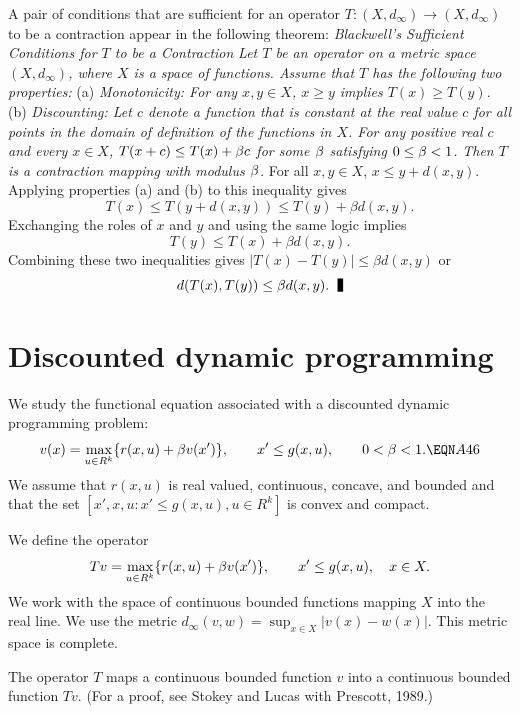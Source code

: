 A pair of conditions that are sufficient for an operator $T:(X,d_\infty)\to
(X,d_\infty)$ to be a contraction appear in the following
theorem:
\medskip
 {\it Blackwell's Sufficient Conditions for $T$ to
be a Contraction}
\medskip
\noindent
{\it Let $T$ be an operator on a metric space $(X,d_\infty)$, where $X$ is a
space of functions.  Assume that $T$ has the following two
properties:}\hfil\break
\noindent(a) {\it Monotonicity:  For any $x,y\in X$, $x\ge y$ implies $T(x) \ge
T(y)$}.\hfil\break
\noindent(b) {\it Discounting:  Let $c$ denote a function that is constant at the
real value $c$ for all points in the domain of definition of the functions in
$X$.  For any positive real $c$ and every $x\in X$, $T(x+c)\le T(x)+{\beta} c$ for
some ${\beta}$
satisfying $0\le {\beta} <1$.}\hfil\break
\noindent
{\it Then $T$ is a contraction mapping with modulus ${\beta}$.}\endtheorem
\medskip
\proof For all $x,y \in X$, $x \leq y + d(x,y)$.  Applying
properties (a) and  (b) to this inequality gives
$$T(x) \leq T(y+d(x,y)) \leq T(y) + \beta d(x,y). $$
Exchanging the roles of $x$ and $y$ and using the same logic
implies
$$ T(y) \leq T(x) + \beta d(x,y). $$
Combining  these two inequalities gives $|T(x) - T(y)| \leq \beta
d(x,y)$ or
$$ d(T(x), T(y)) \leq \beta d(x,y) . \qed $$

\medskip

\section{Discounted dynamic programming}

We study the functional equation associated with a discounted dynamic
programming problem:
$$v(x)=\max_{u\in R^k} \{r(x,u)+\be v(x')\},\qquad x'\le g(x,u),\qquad
0<\be<1.  \EQN A46 $$
We assume that $r(x,u)$ is real valued, continuous, concave, and bounded and
that the set $[x',x,u:x'\le g(x,u),u\in R^k]$ is convex and compact.

We define the operator
$$Tv=\mathop{\hbox{max}}_{u\in R^k} \{r(x,u)+{\beta} v(x')\},\qquad x'\le g(x,u),\quad x\in X.$$
We work with the space of continuous bounded functions mapping $X$ into the
real line.  We use the %
 metric
$d_\infty(v,w) =\sup_{x\in X} |v(x)-w(x)|.$
This metric space is complete.

The operator $T$ maps a continuous bounded function $v$ into a continuous
bounded function $Tv$.  (For a proof, see Stokey and Lucas
with Prescott, 1989.)


